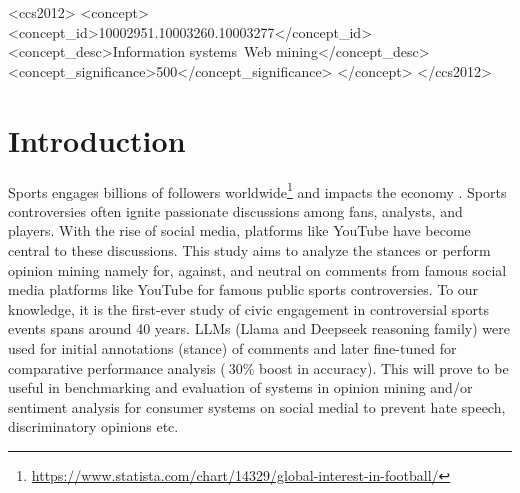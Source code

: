 \documentclass[sigconf, review]{acmart}
\begin{document}
\begin{CCSXML}
<ccs2012>
   <concept>
       <concept_id>10002951.10003260.10003277</concept_id>
       <concept_desc>Information systems~Web mining</concept_desc>
       <concept_significance>500</concept_significance>
       </concept>
 </ccs2012>
\end{CCSXML}



\maketitle

\section{Introduction}


Sports engages billions of followers worldwide\footnote{\url{https://www.statista.com/chart/14329/global-interest-in-football/}} 
and impacts the economy \cite{sportseconomics20221}. Sports controversies often ignite passionate discussions among fans, analysts, and players. With the rise of social media, platforms like YouTube have become central to these discussions. This study aims to analyze the stances or perform opinion mining namely for, against, and neutral on comments from famous social media platforms like YouTube for famous public sports controversies.
To our knowledge, it is the first-ever study of civic engagement in controversial sports events spans around 40 years. LLMs (Llama and Deepseek reasoning family) were used for initial annotations (stance) of comments and later fine-tuned for comparative performance analysis ($~$30\% boost in accuracy).
This will prove to be useful in benchmarking and evaluation of systems in opinion mining and/or sentiment analysis for consumer systems on social medial to prevent hate speech, discriminatory opinions etc. 


\end{document}

